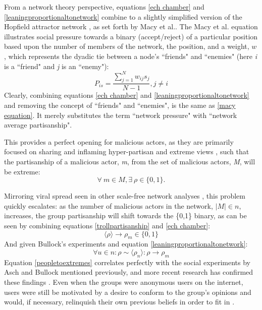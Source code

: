 \documentclass[preprint,review,12pt]{elsarticle}
\begin{document}
 From a network theory perspective, equations \ref{ech chamber} and \ref{leaningproportionaltonetwork} combine to a slightly simplified version of the Hopfield attractor network \cite{hopfield1982neural,hopfield1985neural,nowak1998toward,kitts1999structural}, as set forth by Macy et al.\cite{macy2003polarization}. The Macy et al. equation illustrates social pressure towards a binary (accept/reject) of a particular position based upon the number of members of the network, the position, and a weight, $w$, which represents the dyadic tie between a node's ``friends" and ``enemies" (here \textit{i} is a ``friend" and \textit{j} is an ``enemy"):
\begin{equation}
 \label{macy equation}
 P_{is}=\frac{\sum^{N}_{j=1}w_{ij}s_{j}}{N-1},j\neq i
\end{equation}
Clearly, combining equations \ref{ech chamber} and \ref{leaningproportionaltonetwork} and removing the concept of ``friends" and ``enemies", is the same as \ref{macy equation}. It merely substitutes the term ``network pressure" with ``network average partisanship".
 
 
This provides a perfect opening for malicious actors, as they are primarily focused on sharing and inflaming hyper-partisan and extreme views \cite{shin2018diffusion,bastos2019brexit,hegelich2016social,mueller2019mueller}, such that the partisanship of a malicious actor, \textit{m}, from the set of malicious actors, \textit{M}, will be extreme: 
\begin{equation}
\label{trollpartisanship}
\forall \ m \in M, \exists \ \rho \in \{0,1\}.
\end{equation}

Mirroring viral spread seen in other scale-free network analyses \cite{pastor2001epidemic,cohen2003efficient}, this problem quickly escalates: as the number of malicious actors in the network, $|M| \in n$, increases, the group partisanship will shift towards the \{0,1\} binary, as can be seen by combining equations \ref{trollpartisanship} and \ref{ech chamber}: 
\begin{equation}
\langle \rho \rangle \rightarrow \rho_m \in \{0,1\}
\end{equation} 
And given Bullock's experiments and equation \ref{leaningproportionaltonetwork}:
\begin{equation}
\label{peopletoextremes}
    \forall u \in n: \rho \sim \langle \rho_n \rangle: \rho \rightarrow \rho_m
\end{equation}
Equation \ref{peopletoextremes} correlates perfectly with the social experiments by Asch and Bullock mentioned previously, and more recent research has confirmed these findings \cite{colliander2019fake,edelson2011following}. Even when the groups were anonymous users on the internet, users were still be motivated by a desire to conform to the group's opinions and would, if necessary, relinquish their own previous beliefs in order to fit in \cite{williams2000cyberostracism,zhu2012switch,tsikerdekis2013effects,breitsohl2015groupthink,winter2015they,hamilton2017s}. 
\end{document}
